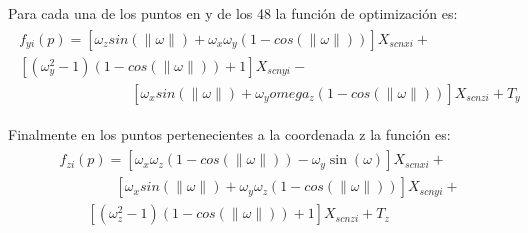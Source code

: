        	Para cada una de los puntos en y de los 48 la función de optimización es:
       	\begin{eqnarray}
       	\begin{array}{c}
       	f_{yi}(p)=[\omega_zsin(\parallel\omega\parallel)+\omega_x\omega_y(1-cos(\parallel\omega\parallel))]X_{scnxi}+\\
       	\left[(\omega_y^2-1)(1-cos(\parallel\omega\parallel))+1\right]X_{scnyi}-\\
       	\qquad \qquad \qquad \qquad
       	\left[\omega_xsin(\parallel\omega\parallel)+\omega_y omega_z(1-cos(\parallel\omega\parallel))\right]X_{scnzi}+T_y
       	\end{array}
       	\end{eqnarray}
       	
       	Finalmente en los puntos pertenecientes a la coordenada z la función es:
       	\begin{eqnarray}
       	\begin{array}{c}
       	f_{zi}(p)=[\omega_x\omega_z(1-cos(\parallel\omega\parallel))-\omega_y\sin(\omega)]X_{scnxi}+\\
       	\qquad \qquad
       	\left[\omega_xsin(\parallel\omega\parallel)+\omega_y\omega_z(1-cos(\parallel\omega\parallel))\right]X_{scnyi}+\\
       	\qquad	
       	\left[(\omega_z^2-1)(1-cos(\parallel\omega\parallel))+1\right]X_{scnzi}+T_z
       	\end{array}
       	\end{eqnarray}
 
